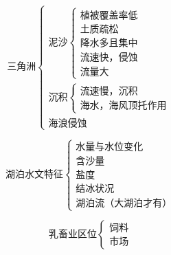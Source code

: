 \documentclass[UTF8]{ctexart}
\begin{document}
\par

\begin{multicols}{2}
    
    \[
        \textbf{三角洲}
        \begin{cases}
            \text{泥沙}
            \begin{cases}
                \text{植被覆盖率低}\\
                \text{土质疏松}\\
                \text{降水多且集中}\\
                \text{流速快，侵蚀}\\
                \text{流量大}
            \end{cases}\\
            \text{沉积}
            \begin{cases}
                \text{流速慢，沉积}\\
                \text{海水，海风顶托作用}
            \end{cases}\\
            \text{海浪侵蚀}
        \end{cases}
    \]

    \[
        \textbf{湖泊水文特征}
        \begin{cases}
            \text{水量与水位变化}\\
            \text{含沙量}\\
            \text{盐度}\\
            \text{结冰状况}\\
            \text{湖泊流（大湖泊才有）}
        \end{cases}
    \]

    \[
        \textbf{乳畜业区位}
        \begin{cases}
            \text{饲料}\\
            \text{市场}
        \end{cases}
    \]

\end{multicols}

\par
\end{document}
